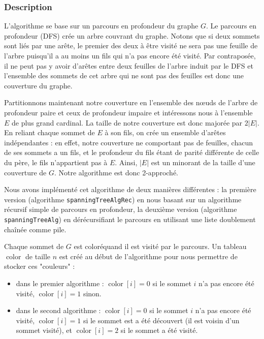 \documentclass[a4paper,10pt]{article}
\DeclareMathOperator{\Color}{color}
\begin{document}
\subsubsection{Description}

L'algorithme se base sur un parcours en profondeur du graphe $G$. Le parcours en profondeur (DFS) crée un arbre couvrant du graphe. Notons que si deux sommets sont liés par une arête, le premier des deux à être visité ne sera pas une feuille de l'arbre puisqu'il a au moins un fils qui n'a pas encore été visité. Par contraposée, il ne peut pas y avoir d'arêtes entre deux feuilles de l'arbre induit par le DFS et l'ensemble des sommets de cet arbre qui ne sont pas des feuilles est donc une couverture du graphe. 

Partitionnons maintenant notre couverture en l'ensemble des nœuds de l'arbre de profondeur paire et ceux de profondeur impaire et intéressons nous à l'ensemble $E$ de plus grand cardinal. La taille de notre couverture est donc majorée par $2|E|$. En reliant chaque sommet de $E$ à son fils, on crée un ensemble d'arêtes indépendantes : en effet, notre couverture ne comportant pas de feuilles, chacun de ses sommets a un fils, et le profondeur du fils étant de parité différente de celle du père, le fils n'appartient pas à $E$. Ainsi, $|E|$ est un minorant de la taille d'une couverture de $G$. Notre algorithme est donc 2-approché.

\bigskip
Nous avons implémenté cet algorithme de deux manières différentes : la première version (algorithme \texttt{spanningTreeAlgRec}) en nous basant sur un algorithme récursif simple de parcours en profondeur, la deuxième version (algorithme \texttt{spanningTreeAlg}) en dérécursifiant le parcours en utilisant une liste doublement chaînée comme pile.

Chaque sommet de $G$ est \og coloré\fg quand il est visité par le parcours. Un tableau $\Color$ de taille $n$ est créé au début de l'algorithme pour nous permettre de stocker ces "couleurs" : 

\begin{itemize}
\item dans le premier algorithme : $\Color[i] = 0$ si le sommet $i$ n'a pas encore été visité, $\Color[i] = 1$ sinon.
\item dans le second algorithme : $\Color[i] = 0$ si le sommet $i$ n'a pas encore été visité, $\Color[i] = 1$ si le sommet est a été découvert (il est voisin d'un sommet visité), et $\Color[i] = 2$ si le sommet a été visité.
\end{itemize}
\end{document}
